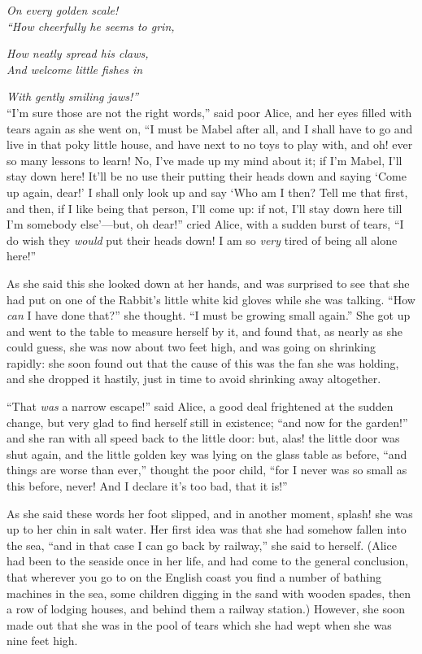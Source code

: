 \documentclass[book, 20pt]{extbook}
\begin{document}
\emph{On every golden scale!\\}
\bigskip
\noindent\emph{``How cheerfully he seems to grin,}

\emph{How neatly spread his claws,\\}
\noindent\emph{And welcome little fishes in}

\emph{With gently smiling jaws!''\\}
\bigskip
``I'm sure those are not the right words,'' said poor Alice, and her
eyes filled with tears again as she went on, ``I must be Mabel after
all, and I shall have to go and live in that poky little house, and have
next to no toys to play with, and oh! ever so many lessons to learn! No,
I've made up my mind about it; if I'm Mabel, I'll stay down here! It'll
be no use their putting their heads down and saying `Come up again,
dear!' I shall only look up and say `Who am I then? Tell me that first,
and then, if I like being that person, I'll come up: if not, I'll stay
down here till I'm somebody else'---but, oh dear!'' cried Alice, with a
sudden burst of tears, ``I do wish they \emph{would} put their heads
down! I am so \emph{very} tired of being all alone here!''

As she said this she looked down at her hands, and was surprised to see
that she had put on one of the Rabbit's little white kid gloves while
she was talking. ``How \emph{can} I have done that?'' she thought. ``I
must be growing small again.'' She got up and went to the table to
measure herself by it, and found that, as nearly as she could guess, she
was now about two feet high, and was going on shrinking rapidly: she
soon found out that the cause of this was the fan she was holding, and
she dropped it hastily, just in time to avoid shrinking away altogether.

``That \emph{was} a narrow escape!'' said Alice, a good deal frightened
at the sudden change, but very glad to find herself still in existence;
``and now for the garden!'' and she ran with all speed back to the
little door: but, alas! the little door was shut again, and the little
golden key was lying on the glass table as before, ``and things are
worse than ever,'' thought the poor child, ``for I never was so small as
this before, never! And I declare it's too bad, that it is!''

As she said these words her foot slipped, and in another moment, splash!
she was up to her chin in salt water. Her first idea was that she had
somehow fallen into the sea, ``and in that case I can go back by
railway,'' she said to herself. (Alice had been to the seaside once in
her life, and had come to the general conclusion, that wherever you go
to on the English coast you find a number of bathing machines in the
sea, some children digging in the sand with wooden spades, then a row of
lodging houses, and behind them a railway station.) However, she soon
made out that she was in the pool of tears which she had wept when she
was nine feet high.
\end{document}
